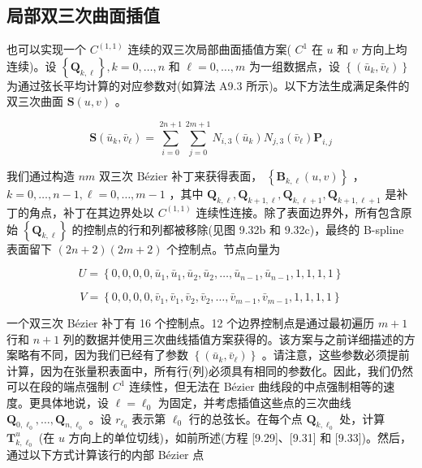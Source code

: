 \documentclass[../main.tex]{subfiles}
\begin{document}
\subsection{局部双三次曲面插值}

也可以实现一个 \({C}^{\left( 1,1\right) }\) 连续的双三次局部曲面插值方案( \({C}^{1}\) 在 \(u\) 和 \(v\) 方向上均连续)。设 \(\left\{  {\mathbf{Q}}_{k,\ell }\right\}  ,k = 0,\ldots ,n\) 和 \(\ell  = 0,\ldots ,m\) 为一组数据点，设 \(\left\{  \left( {{\bar{u}}_{k},{\bar{v}}_{\ell }}\right) \right\}\) 为通过弦长平均计算的对应参数对(如算法 A9.3 所示)。以下方法生成满足条件的双三次曲面 \(\mathbf{S}\left( {u,v}\right)\) 。

\[
\mathbf{S}\left( {{\bar{u}}_{k},{\bar{v}}_{\ell }}\right)  = \mathop{\sum }\limits_{{i = 0}}^{{{2n} + 1}}\mathop{\sum }\limits_{{j = 0}}^{{{2m} + 1}}{N}_{i,3}\left( {\bar{u}}_{k}\right) {N}_{j,3}\left( {\bar{v}}_{\ell }\right) {\mathbf{P}}_{i,j} \tag{9.55}
\]





我们通过构造 \({nm}\) 双三次 Bézier 补丁来获得表面， \(\left\{  {{\mathbf{B}}_{k,\ell }\left( {u,v}\right) }\right\}\) ， \(k = 0,\ldots ,n - 1,\ell  = 0,\ldots ,m - 1\) ，其中 \({\mathbf{Q}}_{k,\ell },{\mathbf{Q}}_{k + 1,\ell },{\mathbf{Q}}_{k,\ell  + 1},{\mathbf{Q}}_{k + 1,\ell  + 1}\) 是补丁的角点，补丁在其边界处以 \({C}^{\left( 1,1\right) }\) 连续性连接。除了表面边界外，所有包含原始 \(\left\{  {\mathbf{Q}}_{k,\ell }\right\}\) 的控制点的行和列都被移除(见图 9.32b 和 9.32c)，最终的 B-spline 表面留下 \(\left( {{2n} + 2}\right) \left( {{2m} + 2}\right)\) 个控制点。节点向量为

\[
U = \left\{  {0,0,0,0,{\bar{u}}_{1},{\bar{u}}_{1},{\bar{u}}_{2},{\bar{u}}_{2},\ldots ,{\bar{u}}_{n - 1},{\bar{u}}_{n - 1},1,1,1,1}\right\}
\]

\[
V = \left\{  {0,0,0,0,{\bar{v}}_{1},{\bar{v}}_{1},{\bar{v}}_{2},{\bar{v}}_{2},\ldots ,{\bar{v}}_{m - 1},{\bar{v}}_{m - 1},1,1,1,1}\right\}   \tag{9.56}
\]

一个双三次 Bézier 补丁有 16 个控制点。12 个边界控制点是通过最初遍历 \(m + 1\) 行和 \(n + 1\) 列的数据并使用三次曲线插值方案获得的。该方案与之前详细描述的方案略有不同，因为我们已经有了参数 \(\left\{  \left( {{\bar{u}}_{k},{\bar{v}}_{\ell }}\right) \right\}\) 。请注意，这些参数必须提前计算，因为在张量积表面中，所有行(列)必须具有相同的参数化。因此，我们仍然可以在段的端点强制 \({C}^{1}\) 连续性，但无法在 Bézier 曲线段的中点强制相等的速度。更具体地说，设 \(\ell  = {\ell }_{0}\) 为固定，并考虑插值这些点的三次曲线 \({\mathbf{Q}}_{0,{\ell }_{0}},\ldots ,{\mathbf{Q}}_{n,{\ell }_{0}}\) 。设 \({r}_{{\ell }_{0}}\) 表示第 \({\ell }_{0}\) 行的总弦长。在每个点 \({\mathbf{Q}}_{k,{\ell }_{0}}\) 处，计算 \({\mathbf{T}}_{k,{\ell }_{0}}^{u}\) (在 \(u\) 方向上的单位切线)，如前所述(方程 [9.29]、[9.31] 和 [9.33])。然后，通过以下方式计算该行的内部 Bézier 点
\end{document}
